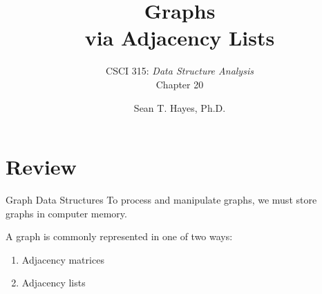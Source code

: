 \documentclass[14pt,aspectratio=1610]{beamer}
\title{\Huge Graphs\\\LARGE via Adjacency Lists}
\subtitle{CSCI 315: \textit{Data Structure Analysis}\\Chapter 20}
\author{Sean T. Hayes, Ph.D.}
\institute{Charleston Southern University}
\begin{document}
\begin{frame}
  \titlepage
\end{frame}

\section*{Review}

\begin{frame}{Graph Data Structures}
  To process and manipulate graphs, we must store \\graphs in computer memory.
  
  A graph is commonly represented in one of two ways:
  \begin{enumerate}
    \item
      Adjacency matrices
    \item
      Adjacency lists
  \end{enumerate}
\end{frame}
\end{document}
